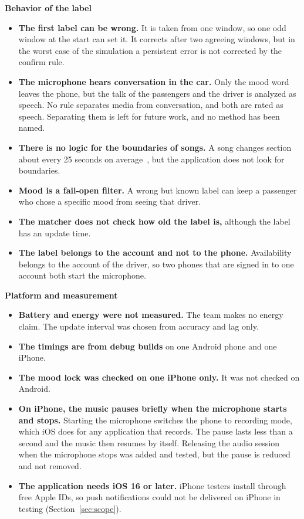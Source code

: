 \textbf{Behavior of the label}
\begin{itemize}
    \item \textbf{The first label can be wrong.} It is taken from one window, so one odd window at the start can set it. It corrects after two agreeing windows, but in the worst case of the simulation a persistent error is not corrected by the confirm rule.
    \item \textbf{The microphone hears conversation in the car.} Only the mood word leaves the phone, but the talk of the passengers and the driver is analyzed as speech. No rule separates media from conversation, and both are rated as speech. Separating them is left for future work, and no method has been named.
    \item \textbf{There is no logic for the boundaries of songs.} A song changes section about every 25 seconds on average~\cite{lyu2026sections}, but the application does not look for boundaries.
    \item \textbf{Mood is a fail-open filter.} A wrong but known label can keep a passenger who chose a specific mood from seeing that driver.
    \item \textbf{The matcher does not check how old the label is,} although the label has an update time.
    \item \textbf{The label belongs to the account and not to the phone.} Availability belongs to the account of the driver, so two phones that are signed in to one account both start the microphone.
\end{itemize}

\textbf{Platform and measurement}
\begin{itemize}
    \item \textbf{Battery and energy were not measured.} The team makes no energy claim. The update interval was chosen from accuracy and lag only.
    \item \textbf{The timings are from debug builds} on one Android phone and one iPhone.
    \item \textbf{The mood lock was checked on one iPhone only.} It was not checked on Android.
    \item \textbf{On iPhone, the music pauses briefly when the microphone starts and stops.} Starting the microphone switches the phone to recording mode, which iOS does for any application that records. The pause lasts less than a second and the music then resumes by itself. Releasing the audio session when the microphone stops was added and tested, but the pause is reduced and not removed.
    \item \textbf{The application needs iOS 16 or later.} iPhone testers install through free Apple IDs, so push notifications could not be delivered on iPhone in testing (Section~\ref{sec:scope}).
\end{itemize}

